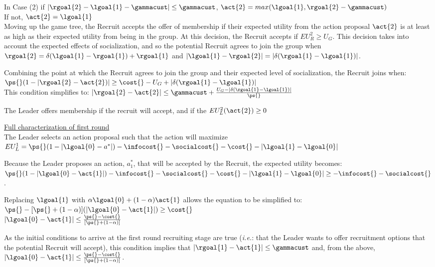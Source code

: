In Case (2) if $|\rgoal{2} - \lgoal{1}- \gammacust| \leq \gammacust$,  $\act{2} = max(\lgoal{1}, \rgoal{2}-\gammacust)$\\
If not, $\act{2} = \lgoal{1}$\\

Moving up the game tree, the Recruit accepts the offer of membership if their expected utility from the action proposal $\act{2}$ is at least as high as their expected utility from being in the group. At this decision, the Recruit accepts if $EU^{2}_{R} \geq U_{G}$. 
This decision takes into account the expected effects of socialization, and so the potential Recruit agrees to join the group when $\rgoal{2}= \delta(\lgoal{1}- \rgoal{1}) + \rgoal{1}$ and  $|\lgoal{1}-\rgoal{2}|= |\delta(\rgoal{1}-\lgoal{1})|$. 

Combining the point at which the Recruit agrees to join the group and their expected level of socialization, the Recruit joins when:\\ $\ps{} (1-|\rgoal{2}- \act{2})|\geq \cost{} - U_{G} + |\delta (\rgoal{1} - \lgoal{1})|$\\
This condition simplifies to: 
$|\rgoal{2}- \act{2}| \leq \gammacust + \frac{U_{G} -|\delta(\rgoal{1}-\lgoal{1})|}{\ps{}}$

The Leader offers membership if the recruit will accept, and if the $EU_{L}^{2}(\act{2}) \geq 0 $

\underline{Full characterization of first round}\\
 
 The Leader selects an action proposal such that the action will maximize  $EU^{1}_{L}= \ps{}(1-|\lgoal{0}- a^{*}|) - \infocost{} -\socialcost{}- \cost{} -|\lgoal{1} - \lgoal{0}|$

Because the Leader proposes an action, $a^{*}_{1}$, that will be accepted by the Recruit, the expected utility becomes:\\
$\ps{}(1-|\lgoal{0}- \act{1}|)- \infocost{} - \socialcost{} -\cost{}- | \lgoal{1}-\lgoal{0}| \geq - \infocost{} - \socialcost{}$.

Replacing $\lgoal{1}$ with $\alpha\lgoal{0}+ (1-\alpha)\act{1}$ allows the equation to be simplified to:\\
$\ps{}-[\ps{} + (1-\alpha)](|\lgoal{0}- \act{1}|)\geq \cost{}$\\
$|\lgoal{0}- \act{1}| \leq \frac{\ps{}- \cost{}}{[\ps{} + (1-\alpha)]}$

As the initial conditions to arrive at the first round recruiting stage are true (\textit{i.e.}: that the Leader wants to offer recruitment options that the potential Recruit will accept), this condition implies that $|\rgoal{1}- \act{1}|\leq \gammacust$ and, from the above, $|\lgoal{0}- \act{1}|\leq \frac{\ps{}- \cost{}}{[\ps{} + (1-\alpha)]}$.

